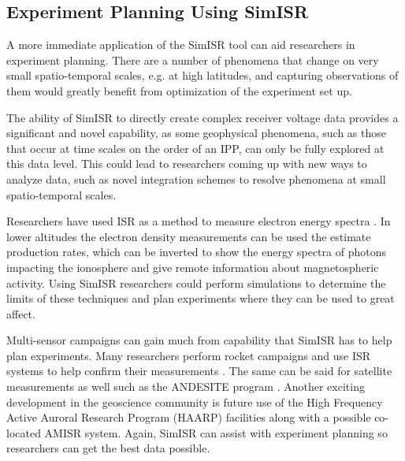 \subsection{Experiment Planning Using SimISR}

A more immediate application of the SimISR tool can aid researchers in experiment planning. There are a number of phenomena that change on very small spatio-temporal scales, e.g. at high latitudes, and capturing observations of them would greatly benefit from optimization of the experiment set up. 

The ability of SimISR to directly create complex receiver voltage data provides a significant and novel capability, as some geophysical phenomena, such as those that occur at time scales on the order of an IPP, can only be fully explored at this data level. This could lead to researchers coming up with new ways to analyze data, such as novel integration schemes to resolve phenomena at small spatio-temporal scales.

Researchers have used ISR as a method to measure electron energy spectra \cite{Semeter:2005foa}. In lower altitudes the electron density measurements can be used the estimate production rates, which can be inverted to show the energy spectra of photons impacting the ionosphere and give remote information about magnetospheric activity. Using SimISR researchers could perform simulations to determine the limits of these techniques and plan experiments where they can be used to great affect.

Multi-sensor campaigns can gain much from capability that SimISR has to help plan experiments. Many researchers perform rocket campaigns and use ISR systems to help confirm their measurements \cite{JGRA:JGRA50924}. The same can be said for satellite measurements as well such as the ANDESITE program \cite{parham2016multi}. Another exciting development in the geoscience community is future use of the High Frequency Active Auroral Research Program (HAARP) facilities \cite{Bernhardt:2016il} along with a possible co-located AMISR system. Again, SimISR can assist with experiment planning so researchers can get the best data possible. 

